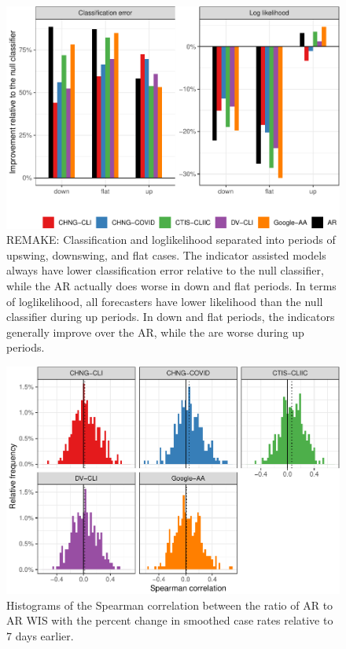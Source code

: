 \documentclass[9pt,twoside,lineno]{pnas-new}
\begin{document}
\begin{figure}

{\centering \includegraphics[width=\textwidth]{fig/hotspots-upswing-downswing-remake-1} 

}

\caption{REMAKE: Classification and loglikelihood separated into periods of upswing, downswing, and flat cases. The indicator assisted models always have lower classification error relative to the null classifier, while the AR actually does worse in down and flat periods. In terms of loglikelihood, all forecasters have lower likelihood than the null classifier during up periods. In down and flat periods, the indicators generally improve over the AR, while the are worse during up periods.}\label{fig:hotspots-upswing-downswing-remake}
\end{figure}

\clearpage

\begin{figure}

{\centering \includegraphics[width=\textwidth]{fig/cor-wis-ratio-1} 

}

\caption{Histograms of the Spearman correlation between the ratio of AR to AR WIS with the percent change in smoothed case rates relative to 7 days earlier.}\label{fig:cor-wis-ratio}
\end{figure}
\end{document}
